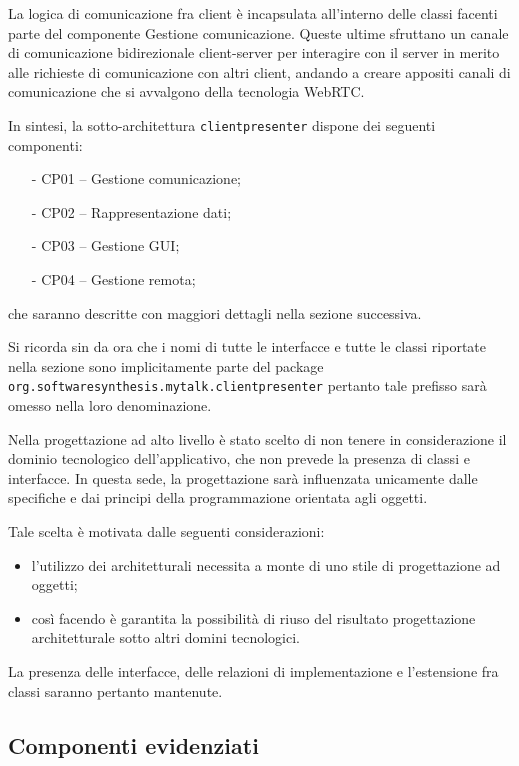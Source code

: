 La logica di comunicazione fra client è incapsulata all'interno delle classi facenti parte del componente \textsf{Gestione comunicazione}. Queste ultime sfruttano un canale di comunicazione bidirezionale client-server per interagire con il server in merito alle richieste di comunicazione con altri client, andando a creare appositi canali di comunicazione che si avvalgono della tecnologia WebRTC\@.

In sintesi, la sotto-architettura \texttt{clientpresenter} dispone dei seguenti componenti:
\begin{itemize}[noitemsep,nolistsep]
	\item[-] \textsf{CP01 -- Gestione comunicazione};
	\item[-] \textsf{CP02 -- Rappresentazione dati};
	\item[-] \textsf{CP03 -- Gestione GUI};
	\item[-] \textsf{CP04 -- Gestione remota};
\end{itemize}
che saranno descritte con maggiori dettagli nella sezione successiva.

Si ricorda sin da ora che i nomi di tutte le interfacce e tutte le classi riportate nella sezione sono implicitamente parte del package \texttt{org.softwaresynthesis.mytalk.clientpresenter} pertanto tale prefisso sarà omesso nella loro denominazione.

Nella progettazione ad alto livello è stato scelto di non tenere in considerazione il dominio tecnologico dell'applicativo, che non prevede la presenza di classi e interfacce. In questa sede, la progettazione sarà influenzata unicamente dalle specifiche e dai principi della programmazione orientata agli oggetti.

Tale scelta è motivata dalle seguenti considerazioni:
\begin{itemize}
   \item l'utilizzo dei  architetturali necessita a monte di uno stile di progettazione ad oggetti;
   \item così facendo è garantita la possibilità di riuso del risultato progettazione architetturale sotto altri domini tecnologici.
\end{itemize}

La presenza delle interfacce, delle relazioni di implementazione e l'estensione fra classi saranno pertanto mantenute.

\subsection{Componenti evidenziati}

